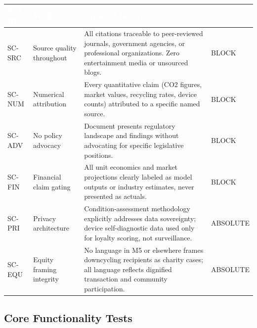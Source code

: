 \documentclass[11pt,letterpaper]{article}
\newcommand{\tableheader}[1]{\textbf{\sffamily\textcolor{white}{#1}}}
\begin{document}
\begin{center}
\begin{tabularx}{\textwidth}{C{1.5cm}XL{4cm}}
\toprule
{}
\tableheader{Test ID} & \tableheader{Verifies} & \tableheader{Expected Behavior} \\
\midrule
SC-SRC & Source quality throughout & All citations traceable to peer-reviewed journals, government agencies, or professional organizations. Zero entertainment media or unsourced blogs. & BLOCK \\
SC-NUM & Numerical attribution & Every quantitative claim (CO2 figures, market values, recycling rates, device counts) attributed to a specific named source. & BLOCK \\
SC-ADV & No policy advocacy & Document presents regulatory landscape and findings without advocating for specific legislative positions. & BLOCK \\
SC-FIN & Financial claim gating & All unit economics and market projections clearly labeled as model outputs or industry estimates, never presented as actuals. & BLOCK \\
SC-PRI & Privacy architecture & Condition-assessment methodology explicitly addresses data sovereignty; device self-diagnostic data used only for loyalty scoring, not surveillance. & ABSOLUTE \\
SC-EQU & Equity framing integrity & No language in M5 or elsewhere frames downcycling recipients as charity cases; all language reflects dignified transaction and community participation. & ABSOLUTE \\
\bottomrule
\end{tabularx}
\end{center}

\subsection{Core Functionality Tests}
\end{document}
